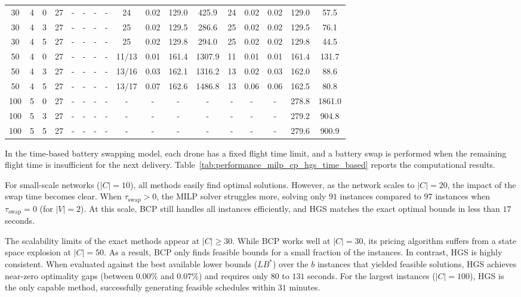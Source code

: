 \documentclass[3p, authoryear, 11pt]{elsarticle}
\begin{document}
\begin{table}[H]
\begin{tabular}{cccc cccc cccc ccccc}
    
    30 & 4 & 0 & 27 & - & - & - & - & 24 & 0.02 & 129.0 & 425.9 & 24 & 0.02 & 0.02 & 129.0 & 57.5 \\
    30 & 4 & 3 & 27 & - & - & - & - & 25 & 0.02 & 129.5 & 286.6 & 25 & 0.02 & 0.02 & 129.5 & 76.1 \\
    30 & 4 & 5 & 27 & - & - & - & - & 25 & 0.02 & 129.8 & 294.0 & 25 & 0.02 & 0.02 & 129.8 & 44.5 \\
    \midrule
    
    50 & 4 & 0 & 27 & - & - & - & - & 11/13 & 0.01 & 161.4 & 1307.9 & 11 & 0.01 & 0.01 & 161.4 & 131.7 \\
    50 & 4 & 3 & 27 & - & - & - & - & 13/16 & 0.03 & 162.1 & 1316.2 & 13 & 0.02 & 0.03 & 162.0 & 88.6 \\
    50 & 4 & 5 & 27 & - & - & - & - & 13/17 & 0.07 & 162.6 & 1486.8 & 13 & 0.06 & 0.06 & 162.5 & 80.8 \\
    \midrule
    
    100 & 5 & 0 & 27 & - & - & - & - & - & - & - & - & - & - & - & 278.8 & 1861.0 \\
    100 & 5 & 3 & 27 & - & - & - & - & - & - & - & - & - & - & - & 279.2 & 904.8 \\
    100 & 5 & 5 & 27& - & - & - & - & - & - & - & - & - & - & - & 279.6 & 900.9 \\
    \bottomrule
    \end{tabular}   
\end{table}

In the time-based battery swapping model, each drone has a fixed flight time limit, and a battery swap is performed when the remaining flight time is insufficient for the next delivery. Table~\ref{tab:performance_milp_cp_hgs_time_based} reports the computational results.

For small-scale networks ($|C|=10$), all methods easily find optimal solutions. However, as the network scales to $|C|=20$, the impact of the swap time becomes clear. When $\tau_{\mathrm{swap}} > 0$, the MILP solver struggles more, solving only $91$ instances compared to $97$ instances when $\tau_{\mathrm{swap}}=0$ (for $|V|=2$). At this scale, BCP still handles all instances efficiently, and HGS matches the exact optimal bounds in less than $17$ seconds.

The scalability limits of the exact methods appear at $|C| \ge 30$. While BCP works well at $|C|=30$, its pricing algorithm suffers from a state space explosion at $|C|=50$. As a result, BCP only finds feasible bounds for a small fraction of the instances. In contrast, HGS is highly consistent. When evaluated against the best available lower bounds ($LB^*$) over the $b$ instances that yielded feasible solutions, HGS achieves near-zero optimality gaps (between $0.00\%$ and $0.07\%$) and requires only $80$ to $131$ seconds. For the largest instances ($|C|=100$), HGS is the only capable method, successfully generating feasible schedules within $31$ minutes.
\end{document}
